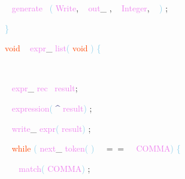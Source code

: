 \documentclass[8, usernames, dvipsnames]{beamer}
\begin{document}
\begin{frame}
\textcolor{White}{\ }
\textcolor{Violet}{generate}\textcolor{White}{\ }
\textcolor{SkyBlue}{(}
\textcolor{Violet}{Write}\textcolor{Sepia}{,}
\textcolor{White}{\ }
\textcolor{Violet}{out}\textcolor{Sepia}{\_}
\textcolor{Sepia}{,}
\textcolor{White}{\ }
\textcolor{Violet}{Integer}\textcolor{Sepia}{,}
\textcolor{White}{\ }
\textcolor{SkyBlue}{)}
\textcolor{Sepia}{;}

 \textcolor{SkyBlue}{\} }

 
 \textcolor{OrangeRed}{void}
\textcolor{White}{\ }
\textcolor{Violet}{expr}\textcolor{Sepia}{\_}
\textcolor{Violet}{list}\textcolor{SkyBlue}{(}
\textcolor{OrangeRed}{void}
\textcolor{SkyBlue}{)}
\textcolor{SkyBlue}{\{ }

 \textcolor{White}{\   }

 \textcolor{White}{\   }
\textcolor{Violet}{expr}\textcolor{Sepia}{\_}
\textcolor{Violet}{rec}\textcolor{White}{\ }
\textcolor{Violet}{result}\textcolor{Sepia}{;}

 \textcolor{White}{\   }
\textcolor{Violet}{expression}\textcolor{SkyBlue}{(}
\textcolor{MidnightBlue}{\textasciicircum}
\textcolor{Violet}{result}\textcolor{SkyBlue}{)}
\textcolor{Sepia}{;}

 \textcolor{White}{\   }
\textcolor{Violet}{write}\textcolor{Sepia}{\_}
\textcolor{Violet}{expr}\textcolor{SkyBlue}{(}
\textcolor{Violet}{result}\textcolor{SkyBlue}{)}
\textcolor{Sepia}{;}

 \textcolor{White}{\   }
\textcolor{OrangeRed}{while}
\textcolor{SkyBlue}{(}
\textcolor{Violet}{next}\textcolor{Sepia}{\_}
\textcolor{Violet}{token}\textcolor{SkyBlue}{(}
\textcolor{SkyBlue}{)}
\textcolor{White}{\ }
\textcolor{OliveGreen}{$==$}
\textcolor{White}{\ }
\textcolor{Violet}{COMMA}\textcolor{SkyBlue}{)}
\textcolor{SkyBlue}{\{ }

 \textcolor{White}{\   }
\textcolor{White}{\   }
\textcolor{Violet}{match}\textcolor{SkyBlue}{(}
\textcolor{Violet}{COMMA}\textcolor{SkyBlue}{)}
\textcolor{Sepia}{;}

 \end{frame}
\end{document}
